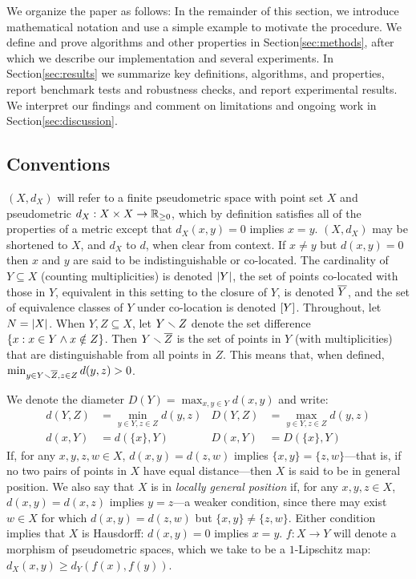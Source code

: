 \documentclass{article}
\begin{document}
We organize the paper as follows: In the remainder of this section, we
introduce mathematical notation and use a simple example to motivate the
procedure. We define and prove algorithms and other properties in
Section\nbs\ref{sec:methods}, after which we describe our implementation
and several experiments. In Section\nbs\ref{sec:results} we summarize
key definitions, algorithms, and properties, report benchmark tests and
robustness checks, and report experimental results. We interpret our
findings and comment on limitations and ongoing work in
Section\nbs\ref{sec:discussion}.

\hypertarget{conventions}{%
\subsection{Conventions}\label{conventions}}

\((X, d_X)\) will refer to a finite pseudometric space with point set
\(X\) and pseudometric \(d_X:X\times X\to\mathbb{R}_{\geq 0}\), which by
definition satisfies all of the properties of a metric except that
\(d_X(x,y)=0\) implies \(x=y\). \((X,d_X)\) may be shortened to \(X\),
and \(d_X\) to \(d\), when clear from context. If \(x\neq y\) but
\(d(x,y)=0\) then \(x\) and \(y\) are said to be indistinguishable or
co-located. The cardinality of \(Y\subseteq X\) (counting
multiplicities) is denoted \(\lvert Y\rvert\), the set of points co-located
with those in \(Y\), equivalent in this setting to the closure of \(Y\),
is denoted \(\overline{Y}\), and the set of equivalence classes of \(Y\) under
co-location is denoted \([Y]\). Throughout, let \(N=\lvert X\rvert\). When
\(Y,Z\subseteq X\), let \(Y\smallsetminus Z\) denote the set difference
\(\{x : x \in Y \wedge x \notin Z\}\). Then \(Y \smallsetminus \overline{Z}\) is the
set of points in \(Y\) (with multiplicities) that are distinguishable
from all points in \(Z\). This means that, when defined,
\(\min_{y\in Y\smallsetminus \overline{Z},z\in Z}{d(y, z)}>0\).

We denote the diameter \(D(Y)=\max_{x,y\in Y}{d(x,y)}\) and write:
\begin{align*}
d(Y,Z) &= \min_{y\in Y,z\in Z}{d(y,z)} & D(Y,Z) &= \max_{y\in Y,z\in Z}{d(y,z)} \\
d(x,Y) &= d(\{x\},Y)                   & D(x,Y) &= D(\{x\},Y)
\end{align*} If, for any \(x,y,z,w \in X\), \(d(x,y)=d(z,w)\) implies
\(\{x,y\}=\{z,w\}\)---that is, if no two pairs of points in \(X\) have
equal distance---then \(X\) is said to be in general position. We also
say that \(X\) is in \emph{locally general position} if, for any
\(x,y,z \in X\), \(d(x,y)=d(x,z)\) implies \(y=z\)---a weaker condition,
since there may exist \(w \in X\) for which \(d(x,y)=d(z,w)\) but
\(\{x,y\}\neq\{z,w\}\). Either condition implies that \(X\) is
Hausdorff: \(d(x,y)=0\) implies \(x=y\). \(f:X \to Y\) will denote a
morphism of pseudometric spaces, which we take to be a \(1\)-Lipschitz
map: \(d_X(x,y)\geq d_Y(f(x),f(y))\).
\end{document}
